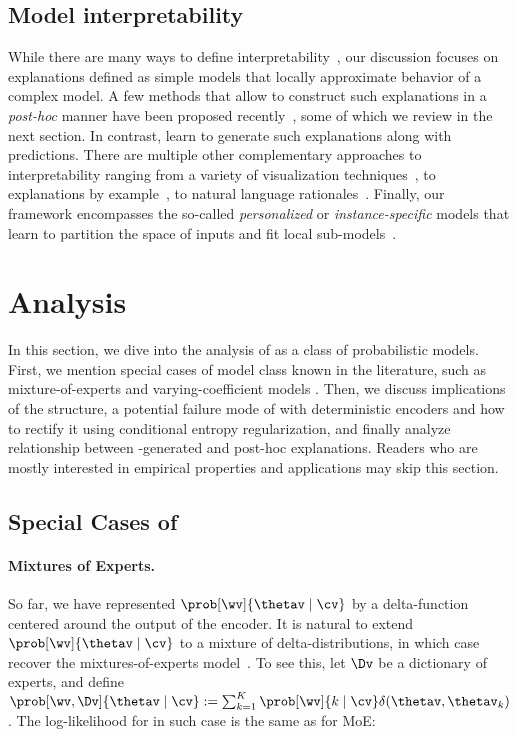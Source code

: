 \documentclass[twoside,11pt]{article}
\begin{document}
\subsection{Model interpretability}
While there are many ways to define interpretability~\citep{lipton2016mythos,doshi2017towards},
our discussion focuses on explanations defined as simple models that locally approximate behavior of a complex model.
A few methods that allow to construct such explanations in a \emph{post-hoc} manner have been proposed recently~\citep{ribeiro2016trust,shrikumar2017learning,lundberg2017shap}, some of which we review in the next section.
In contrast, {\CENs} learn to generate such explanations along with predictions.
There are multiple other complementary approaches to interpretability ranging from a variety of visualization techniques~\citep{simonyan2014vgg,yosinski2015understanding,mahendran2015understanding,karpathy2015visualizing}, to explanations by example~\citep{caruana1999case,kim2014bayesian,kim2016examples,koh2017understanding}, to natural language rationales~\citep{lei2016rationalizing}.
Finally, our framework encompasses the so-called \emph{personalized} or \emph{instance-specific} models that learn to partition the space of inputs and fit local sub-models~\citep{joseph2012local}.
 
\section{Analysis}
\label{sec:analysis}

In this section, we dive into the analysis of {\CEN} as a class of probabilistic models.
First, we mention special cases of {\CEN} model class known in the literature, such as mixture-of-experts \citep{jacobs1991adaptive} and varying-coefficient models \citep{hastie1993vcm}.
Then, we discuss implications of the {\CEN} structure, a potential failure mode of {\CEN} with deterministic encoders and how to rectify it using conditional entropy regularization, and finally analyze relationship between {\CEN}-generated and post-hoc explanations.
Readers who are mostly interested in empirical properties and applications may skip this section.

\subsection{Special Cases of {\CEN}}
\label{sec:CEN-special-calses}

\paragraph{Mixtures of Experts.}
So far, we have represented $\prob[\wv]{\thetav \mid \cv}$ by a delta-function centered around the output of the encoder.
It is natural to extend $\prob[\wv]{\thetav \mid \cv}$ to a mixture of delta-distributions, in which case {\CENs} recover the mixtures-of-experts model~\citep[MoE,][]{jacobs1991adaptive}.
To see this, let $\Dv$ be a dictionary of experts, and define $\prob[\wv,\Dv]{\thetav \mid \cv} := \sum_{k=1}^K \prob[\wv]{k \mid \cv} \delta(\thetav, \thetav_k)$.
The log-likelihood for {\CEN} in such case is the same as for MoE:
\end{document}
